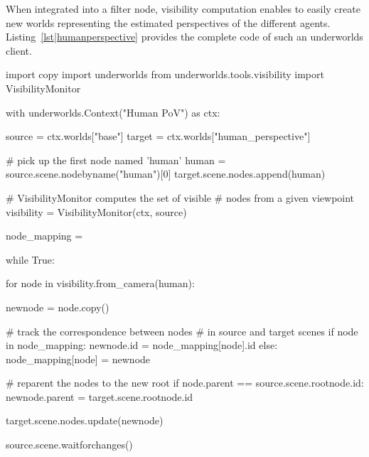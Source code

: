 \documentclass[letterpaper, 10 pt, conference]{ieeeconf}  %
\newcommand{\uwds}{{\sc underworlds}\xspace}
\begin{document}
When integrated into a filter node, visibility computation enables to easily
create new worlds representing the estimated perspectives of the different
agents. Listing~\ref{lst|humanperspective} provides the complete code of such an
\uwds client.


\begin{listing}[h!]
\begin{pythoncode}
import copy
import underworlds
from underworlds.tools.visibility import VisibilityMonitor

with underworlds.Context("Human PoV") as ctx:

    source = ctx.worlds["base"]
    target = ctx.worlds["human_perspective"]

    # pick up the first node named 'human'
    human = source.scene.nodebyname("human")[0]
    target.scene.nodes.append(human)

    # VisibilityMonitor computes the set of visible 
    # nodes from a given viewpoint
    visibility = VisibilityMonitor(ctx, source)

    node_mapping = {}

    while True:

        for node in visibility.from_camera(human):

            newnode = node.copy()

            # track the correspondence between nodes
            # in source and target scenes
            if node in node_mapping:
                newnode.id = node_mapping[node].id
            else:
                node_mapping[node] = newnode

            # reparent the nodes to the new root
            if node.parent == source.scene.rootnode.id:
                newnode.parent = target.scene.rootnode.id

            target.scene.nodes.update(newnode)

        source.scene.waitforchanges()

\end{pythoncode}
    \caption{Example of an \uwds client that creates a world named {\tt
    human\_perspective} from a source world {\tt base} by only updating objects
    that are in the field of view of the human. As such, {\tt human\_perspective} is
    a real-time model of the human perspective on the scene.}
    
    \label{lst|humanperspective} \end{listing}
\end{document}
